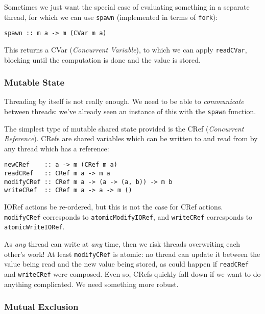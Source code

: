 Sometimes we just want the special case of evaluating something in a
separate thread, for which we can use \texttt{spawn} (implemented in
terms of \texttt{fork}):

\begin{verbatim}
spawn :: m a -> m (CVar m a)
\end{verbatim}

This returns a CVar (\textit{Concurrent Variable}), to which we can
apply \texttt{readCVar}, blocking until the computation is done and
the value is stored.


\subsubsection*{Mutable State}
\label{conc-crefs}

Threading by itself is not really enough. We need to be able to
\textit{communicate} between threads: we've already seen an instance
of this with the \texttt{spawn} function.

The simplest type of mutable shared state provided is the CRef
(\textit{Concurrent Reference}). CRefs are shared variables which can
be written to and read from by any thread which has a reference:

\begin{verbatim}
newCRef    :: a -> m (CRef m a)
readCRef   :: CRef m a -> m a
modifyCRef :: CRef m a -> (a -> (a, b)) -> m b
writeCRef  :: CRef m a -> a -> m ()
\end{verbatim}

\begin{departure}
  IORef actions be re-ordered\cite{ioref}, but this is not the case
  for CRef actions. \texttt{modifyCRef} corresponds to
  \texttt{atomicModifyIORef}, and \texttt{writeCRef} corresponds to
  \texttt{atomicWriteIORef}.
\end{departure}

As \textit{any} thread can write at \textit{any} time, then we risk
threads overwriting each other's work! At least \texttt{modifyCRef} is
atomic: no thread can update it between the value being read and the
new value being stored, as could happen if \texttt{readCRef} and
\texttt{writeCRef} were composed. Even so, CRefs quickly fall down if
we want to do anything complicated. We need something more robust.

\subsubsection*{Mutual Exclusion}
\label{sec:prelims-dejafu-conc-cvars}


